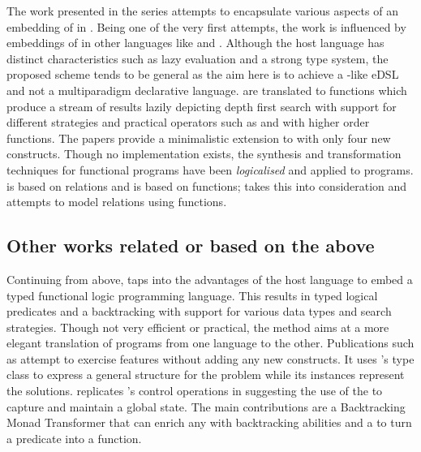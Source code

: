 \documentclass[thesis-solanki.tex]{subfiles}
\begin{document}
The work presented in the series
\cite{spivey1999embedding,seres1999algebra,seres2001higher,spivey1999algebra,seres2001algebra} attempts to
encapsulate various aspects of an embedding of  in .
Being one of the very first attempts, the work is influenced by embeddings of  in other languages
like  and .
Although the host language  has distinct characteristics such as lazy evaluation and a strong
type system, the proposed scheme tends to be general as the aim here is to achieve a -like eDSL
and not a multiparadigm declarative language.
  are translated to  functions which produce a
stream of results lazily depicting depth first search with support for different strategies and practical operators
such as  and  with higher order functions.
The papers provide a minimalistic extension to  with only four new constructs.
Though no implementation exists, the synthesis and transformation techniques for functional programs have been
\textit{logicalised} and applied to  programs.
 is based on relations and  is based on functions; \cite{spivey2000functional}
takes this into consideration and attempts to model relations using functions.


\subsection{Other works related or based on the above}


Continuing from above, \cite{claessen2000typed} taps into the advantages of the host language to embed a typed
functional logic programming language.
This results in typed logical predicates and a backtracking  with support for various data
types and search strategies.
Though not very efficient or practical,
the method aims at a more elegant translation of programs from one language
to the other.
Publications such as \cite{erwig2004escape} attempt to exercise  features without adding any new 
constructs.
It uses 's type class to express a general structure for the problem while its instances
represent the solutions.
\cite{hinze1998prological} replicates 's control operations in  suggesting the
use of the   to capture and maintain a global state.
The main contributions are a Backtracking Monad Transformer that can enrich any  with
backtracking abilities and a  to turn a  predicate into a
 function.
\end{document}
